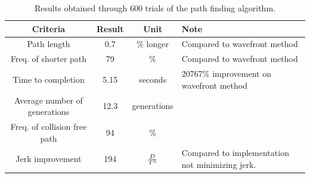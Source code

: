 {\renewcommand{\arraystretch}{1.4}
	\begin{center}
		\begin{table}[h]
		\begin{tabular}{ c | c  c  p{2cm} }
		Criteria & Result & Unit & Note \\ \hline
		Path length & 0.7 & \% longer & Compared to wavefront method \\ 
		Freq. of shorter path & 79 & \% & Compared to wavefront method \\ 
		Time to completion & 5.15 & seconds & 20767\% improvement on wavefront method \\ 
		Average number of generations & 12.3 & generations & \\ 
		Freq. of collision free path & 94 & \% &  \\ 
		Jerk improvement & 194 & ${{D}\over{T^3}}$ & Compared to implementation not minimizing jerk.\\ 
		\end{tabular}
		\caption{Results obtained through 600 trials of the path finding algorithm.}
		\end{table}
	\end{center}
}


